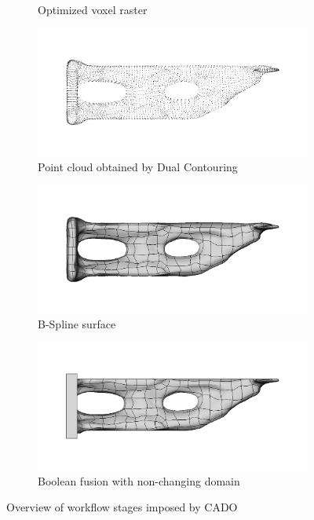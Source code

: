 \begin{figure}
\begin{subfigure}[t]{.49\textwidth}
\caption{Optimized voxel raster}
\end{subfigure}
\begin{subfigure}[t]{.49\textwidth}
\centering
\includegraphics[width=\textwidth]{Pictures/CADO_Overview/Back2CAD4.png}
\caption{Point cloud obtained by Dual Contouring}
\end{subfigure}
\begin{subfigure}[t]{.49\textwidth}
\centering
\includegraphics[width=\textwidth]{Pictures/CADO_Overview/Back2CAD5.png}
\caption{B-Spline surface}
\end{subfigure}
\begin{subfigure}[t]{.49\textwidth}
\centering
\includegraphics[width=\textwidth]{Pictures/CADO_Overview/Back2CAD6.png}
\caption{Boolean fusion with non-changing domain}
\end{subfigure}
\caption{Overview of workflow stages imposed by CADO}
\end{figure}


